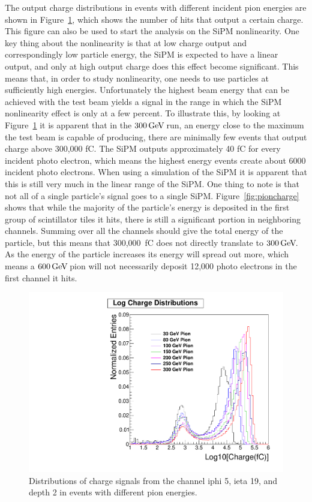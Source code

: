 The output charge distributions in events with different incident pion energies are shown in Figure~\ref{fig:Log}, which shows the number of hits that output a certain charge. This figure can also be used to start the analysis on the SiPM nonlinearity. One key thing about the nonlinearity is that at low charge output and correspondingly low particle energy, the SiPM is expected to have a linear output, and only at high output charge does this effect become significant. This means that, in order to study nonlinearity, one needs to use particles at sufficiently high energies. Unfortunately the highest beam energy that can be achieved with the test beam yields a signal in the range in which the SiPM nonlinearity effect is only at a few percent. To illustrate this, by looking at Figure~\ref{fig:Log} it is apparent that in the $300{\,\text{Ge\hspace{-.08em}V\hspace{-0.16em}}}$ run, an energy close to the maximum the test beam is capable of producing, there are minimally few events that output charge above 300,000 fC. The SiPM outputs approximately 40 fC for every incident photo electron, which means the highest energy events create about 6000 incident photo electrons. When using a simulation of the SiPM it is apparent that this is still very much in the linear range of the SiPM. One thing to note is that not all of a single particle's signal goes to a single SiPM. Figure~\ref{fig:pioncharge} shows that while the majority of the particle's energy is deposited in the first group of scintillator tiles it hits, there is still a significant portion in neighboring channels. Summing over all the channels should give the total energy of the particle, but this means that 300,000~fC does not directly translate to $300{\,\text{Ge\hspace{-.08em}V\hspace{-0.16em}}}$. As the energy of the particle increases its energy will spread out more, which means a $600{\,\text{Ge\hspace{-.08em}V\hspace{-0.16em}}}$ pion will not necessarily deposit 12,000 photo electrons in the first channel it hits.

\begin{figure}
\centering
\includegraphics[width=0.7\linewidth]{Figures/Logplot.pdf}
\caption{Distributions of charge signals from the channel iphi 5, ieta 19, and depth 2 in events with different pion energies.}
\label{fig:Log}
\end{figure}

